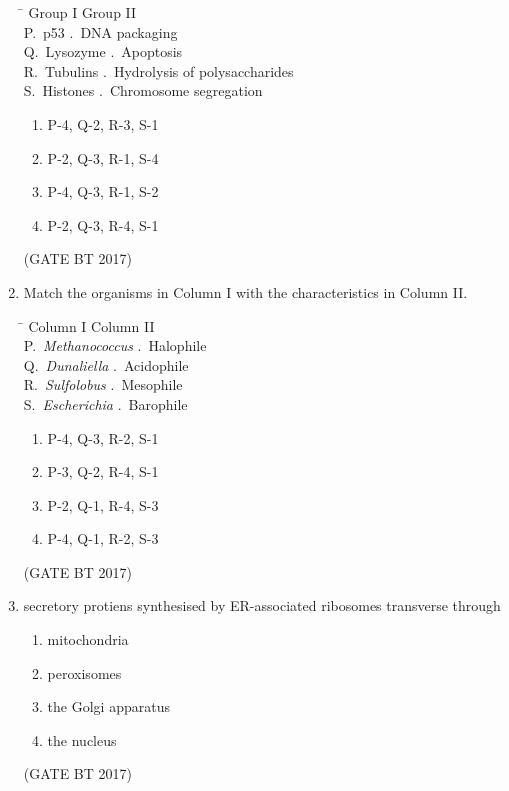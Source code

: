 \documentclass[journal,12pt,onecolumn]{IEEEtran}
\theoremstyle{remark}
\begin{document}
\begin{enumerate}
\begin{tabbing}
\hspace{4cm} \= \kill
Group I \> Group II \\
P.\ p53 .\ DNA packaging \\
Q.\ Lysozyme .\ Apoptosis \\
R.\ Tubulins .\ Hydrolysis of polysaccharides \\
S.\ Histones .\ Chromosome segregation \\
\end{tabbing}

\begin{enumerate}
    \item P-4, Q-2, R-3, S-1
    \item P-2, Q-3, R-1, S-4
    \item P-4, Q-3, R-1, S-2
    \item P-2, Q-3, R-4, S-1
\end{enumerate}
\hfill (GATE BT 2017)

\item Match the organisms in Column I with the characteristics in Column II.

\begin{tabbing}
\hspace{4cm} \= \kill
Column I \> Column II \\
P.\ \textit{Methanococcus} .\ Halophile \\
Q.\ \textit{Dunaliella} .\ Acidophile \\
R.\ \textit{Sulfolobus} .\ Mesophile \\
S.\ \textit{Escherichia} .\ Barophile \\
\end{tabbing}

\begin{enumerate}
    \item P-4, Q-3, R-2, S-1
    \item P-3, Q-2, R-4, S-1
    \item P-2, Q-1, R-4, S-3
    \item P-4, Q-1, R-2, S-3
\end{enumerate}
\hfill (GATE BT 2017)

\item 
secretory protiens synthesised by ER-associated ribosomes transverse through

\begin{enumerate}
    \item mitochondria
    \item peroxisomes
    \item the Golgi apparatus
    \item the nucleus
\end{enumerate}
\hfill (GATE BT 2017)


\end{enumerate}
\end{document}
